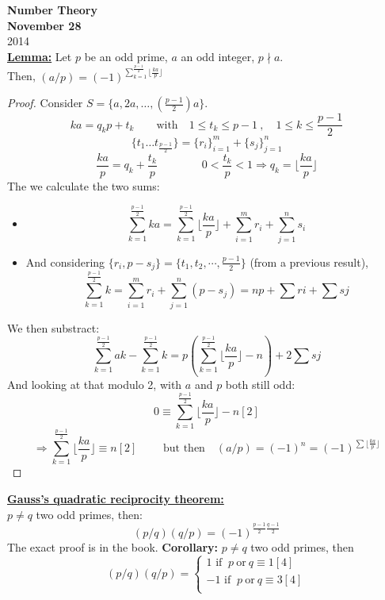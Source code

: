 \documentclass{report}
\begin{document}
\newpage


{\centering
\Large
\textbf{Number Theory}\\
\normalsize
\textbf{November 28}\\
2014\\
}
\vspace{10mm}
\underline{\textbf{Lemma:}} Let $p$ be an odd prime, $a$ an odd integer, $p \nmid a$.\\
Then, $(a/p)=(-1)^{\sum_{k=1}^{\frac{p-1}{2}} \lfloor \frac{ka}{p} \rfloor}$	
\begin{proof} Consider $S=\{a,2a,\dots,(\frac{p-1}{2})a\}$.
											 \[ka = q_kp+t_k \qquad \text{with}\quad 1\leq t_k\leq p-1 \:,\quad 1 \leq k \leq \frac{p-1}{2}\]
											 \[\{t_1 \dots t_{\frac{p-1}{2}}\}=\{r_i\}_{i=1}^m+\{s_j\}_{j=1}^n\]
											 \[\frac{ka}{p}=q_k+\frac{t_k}{p} \qquad \qquad 0<\frac{t_k}{p}<1 \Rightarrow q_k= \lfloor \frac{ka}{p} \rfloor\]
							The we calculate the two sums:\begin{itemize}
											\item \[\sum_{k=1}^{\frac{p-1}{2}} ka = \sum_{k=1}^{\frac{p-1}{2}} \lfloor \frac{ka}{p} \rfloor + \sum_{i=1}^{m}r_i + \sum_{j=1}^{n}s_i\]
											\item And considering $\{r_i, p-s_j\}=\{t_1,t_2,\cdots,\frac{p-1}{2}\}$ (from a previous result),
																						\[\sum_{k=1}^{\frac{p-1}{2}} k = \sum_{i=1}^{m} r_i+ \sum_{j=1}^{n}(p-s_j)=np+\sum{ri}+\sum{sj}\]
											\end{itemize}
							We then substract: \[ \sum_{k=1}^{\frac{p-1}{2}} ak - \sum_{k=1}^{\frac{p-1}{2}}k = p(\sum_{k=1}^{\frac{p-1}{2}}\lfloor \frac{ka}{p} \rfloor - n)+ 2 \sum sj\]
							And looking at that modulo 2, with $a$ and $p$ both still odd: \[ 0 \equiv \sum_{k=1}^{\frac{p-1}{2}} \lfloor \frac{ka}{p} \rfloor -n [2]\]
																																							\[\Rightarrow \sum_{k=1}^{\frac{p-1}{2}} \lfloor \frac{ka}{p} \rfloor \equiv n [2] \qquad \text{ but then} \quad (a/p)=(-1)^n=(-1)^{\sum \lfloor \frac{ka}{p} \rfloor}\]
\end{proof}
\underline{\textbf{Gauss's quadratic reciprocity theorem:}}\\
									$p\neq q$ two odd primes, then: \[(p/q)(q/p)=(-1)^{\frac{p-1}{2}\frac{q-1}{2}}\]
									The exact proof is in the book.
\textbf{Corollary:} $p\neq q$ two odd primes, then \[(p/q)(q/p)=\left \{ 
																																\begin{array}{lcl}
																																1 \text{ if }\: p \:\text{or} \:q \equiv 1[4]\\
																																-1 \text{ if }\: p \:\text{or} \:q \equiv 3[4]\\
																																\end{array} 
																																\right.\]
\end{document}
